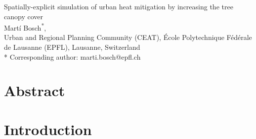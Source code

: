 \documentclass[10pt,letterpaper]{article}
\begin{document}
\vspace*{0.35in}



\begin{flushleft}
{\Large Spatially-explicit simulation of urban heat mitigation by increasing the tree canopy cover
\textbf\newline{}
}
\newline
\\
Mart\'i Bosch\textsuperscript{*},
\\
\bigskip
Urban and Regional Planning Community (CEAT), \'Ecole Polytechnique F\'ed\'erale de Lausanne (EPFL), Lausanne, Switzerland
\\ 
\bigskip
* Corresponding author: marti.bosch@epfl.ch

\end{flushleft}

\section*{Abstract}




\linenumbers

\section*{Introduction}

\end{document}
